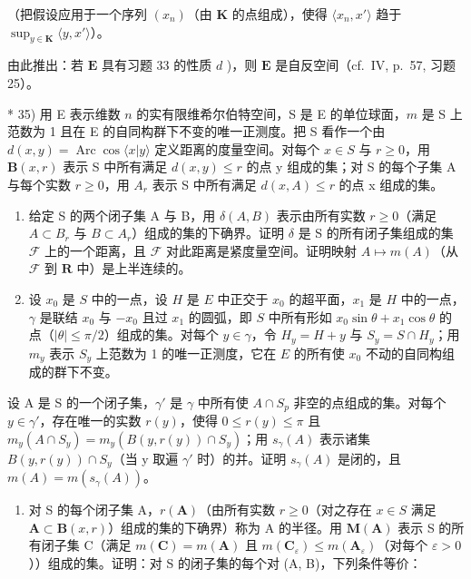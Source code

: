 （把假设应用于一个序列 \((x_{n})\)（由 \(\mathbf{K}\) 的点组成），使得 \(\langle x_n, x'\rangle\) 趋于 \(\sup_{y\in \mathbf{K}}\langle y, x'\rangle\)）。

由此推出：若 \(\mathbf{E}\) 具有习题 33 的性质 \(d\) )，则 \(\mathbf{E}\) 是自反空间（cf.~IV, p.~57, 习题 25）。

* 35) 用 E 表示维数 \(n\) 的实有限维希尔伯特空间，S 是 E 的单位球面，\(m\) 是 S 上范数为 1 且在 E 的自同构群下不变的唯一正测度。把 S 看作一个由 \(d(x, y) = \operatorname{Arc} \cos \langle x | y \rangle\) 定义距离的度量空间。对每个 \(x \in S\) 与 \(r \geqslant 0\)，用 \(\mathbf{B}(x, r)\) 表示 S 中所有满足 \(d(x, y) \leqslant r\) 的点 y 组成的集；对 S 的每个子集 A 与每个实数 \(r \geqslant 0\)，用 \(A_r\) 表示 S 中所有满足 \(d(x, A) \leqslant r\) 的点 x 组成的集。

\begin{enumerate}
\def\labelenumi{\alph{enumi})}
\item
  给定 S 的两个闭子集 A 与 B，用 \(\delta(A, B)\) 表示由所有实数 \(r \geqslant 0\)（满足 \(A \subset B_r\) 与 \(B \subset A_r\)）组成的集的下确界。证明 \(\delta\) 是 S 的所有闭子集组成的集 \(\mathcal{F}\) 上的一个距离，且 \(\mathcal{F}\) 对此距离是紧度量空间。证明映射 \(A \mapsto m(A)\)（从 \(\mathcal{F}\) 到 \(\mathbf{R}\) 中）是上半连续的。
\item
  设 \(x_0\) 是 \(S\) 中的一点，设 \(H\) 是 \(E\) 中正交于 \(x_0\) 的超平面，\(x_1\) 是 \(H\) 中的一点，\(\gamma\) 是联结 \(x_0\) 与 \(-x_0\) 且过 \(x_1\) 的圆弧，即 \(S\) 中所有形如 \(x_0 \sin \theta + x_1 \cos \theta\) 的点（\(|\theta| \leqslant \pi / 2\)）组成的集。对每个 \(y \in \gamma\)，令 \(H_y = H + y\) 与 \(S_y = S \cap H_y\)；用 \(m_y\) 表示 \(S_y\) 上范数为 1 的唯一正测度，它在 \(E\) 的所有使 \(x_0\) 不动的自同构组成的群下不变。
\end{enumerate}

设 A 是 S 的一个闭子集，\(\gamma'\) 是 \(\gamma\) 中所有使 \(A \cap S_{p}\) 非空的点组成的集。对每个 \(y \in \gamma'\)，存在唯一的实数 \(r(y)\)，使得 \(0 \leqslant r(y) \leqslant \pi\) 且 \(m_{y}(A \cap S_{y}) = m_{y}(B(y, r(y)) \cap S_{y})\)；用 \(s_{\gamma}(A)\) 表示诸集 \(B(y, r(y)) \cap S_{y}\)（当 y 取遍 \(\gamma'\) 时）的并。证明 \(s_{\gamma}(A)\) 是闭的，且 \(m(A) = m(s_{\gamma}(A))\)。

\begin{enumerate}
\def\labelenumi{\alph{enumi})}
\setcounter{enumi}{2}
\tightlist
\item
  对 S 的每个闭子集 A，\(r(\mathbf{A})\)（由所有实数 \(r \geqslant 0\)（对之存在 \(x \in S\) 满足 \(\mathbf{A} \subset \mathbf{B}(x, r)\)）组成的集的下确界）称为 A 的半径。用 \(\mathbf{M}(\mathbf{A})\) 表示 S 的所有闭子集 C（满足 \(m(\mathbf{C}) = m(\mathbf{A})\) 且 \(m(\mathbf{C}_{\varepsilon}) \leqslant m(\mathbf{A}_{\varepsilon})\)（对每个 \(\varepsilon > 0\)））组成的集。证明：对 S 的闭子集的每个对 (A, B)，下列条件等价：
\end{enumerate}

